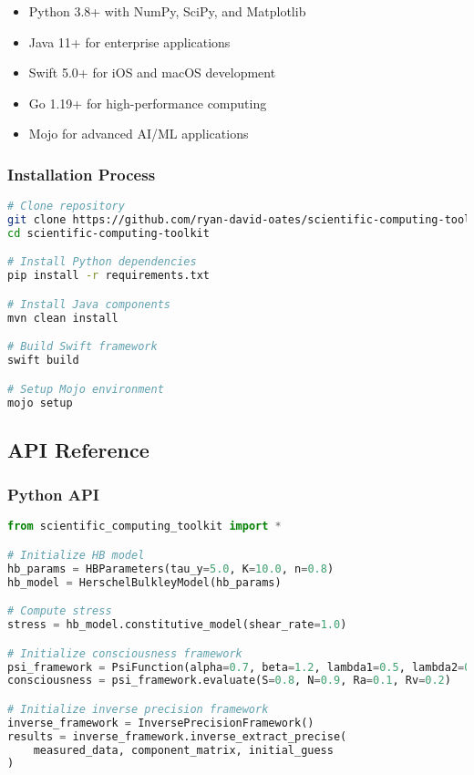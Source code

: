 \documentclass[11pt,a4paper]{article}
\begin{document}
\begin{itemize}
    \item Python 3.8+ with NumPy, SciPy, and Matplotlib
    \item Java 11+ for enterprise applications
    \item Swift 5.0+ for iOS and macOS development
    \item Go 1.19+ for high-performance computing
    \item Mojo for advanced AI/ML applications
\end{itemize}

\subsubsection{Installation Process}
\label{subsubsec:installation_process}

\begin{lstlisting}[language=bash]
# Clone repository
git clone https://github.com/ryan-david-oates/scientific-computing-toolkit.git
cd scientific-computing-toolkit

# Install Python dependencies
pip install -r requirements.txt

# Install Java components
mvn clean install

# Build Swift framework
swift build

# Setup Mojo environment
mojo setup
\end{lstlisting}

\subsection{API Reference}
\label{subsec:api_reference}

\subsubsection{Python API}
\label{subsubsec:python_api}

\begin{lstlisting}[language=Python]
from scientific_computing_toolkit import *

# Initialize HB model
hb_params = HBParameters(tau_y=5.0, K=10.0, n=0.8)
hb_model = HerschelBulkleyModel(hb_params)

# Compute stress
stress = hb_model.constitutive_model(shear_rate=1.0)

# Initialize consciousness framework
psi_framework = PsiFunction(alpha=0.7, beta=1.2, lambda1=0.5, lambda2=0.3)
consciousness = psi_framework.evaluate(S=0.8, N=0.9, Ra=0.1, Rv=0.2)

# Initialize inverse precision framework
inverse_framework = InversePrecisionFramework()
results = inverse_framework.inverse_extract_precise(
    measured_data, component_matrix, initial_guess
)
\end{lstlisting}
\end{document}

